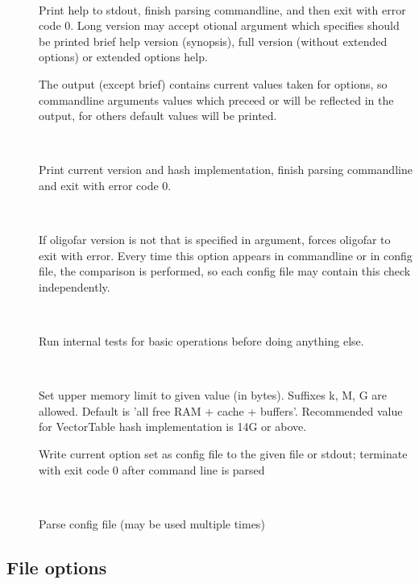 \documentclass[english,letter]{article}
\begin{document}
\begin{description}
\item[~~] 
				Print help to stdout, finish parsing commandline, and then 
                exit with error code 0. Long version may accept otional 
                argument which specifies should be printed brief help version
                (synopsis), full version (without extended options) or extended
                options help.

                The output (except brief) contains current values taken for options, 
                so commandline arguments values which preceed  or  will
                be reflected in the output, for others default values will be
                printed.

\item[~~]
				Print current version and hash implementation, finish parsing
                commandline and exit with error code 0.

\item[~~]
				If oligofar version is not that is specified in argument,
                forces oligofar to exit with error.  Every time this option 
                appears in commandline or in config file, the comparison is
                performed, so each config file may contain this check
                independently.  

\item[~~]
				Run internal tests for basic operations before doing anything
                else.
\item[~~]
				Set upper memory limit to given value (in bytes). Suffixes k,
                M, G are allowed. Default is 'all free RAM + cache + buffers'.
                Recommended value for VectorTable hash implementation is 14G or
                above.
\item[]
				Write current option set as config file to the given file or stdout; 
				terminate with exit code 0 after command line is parsed
\item[~~]
				Parse config file (may be used multiple times)
\end{description}

\subsection{File options}
\end{document}
